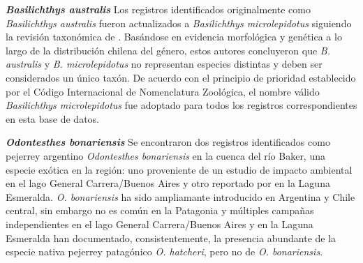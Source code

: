 \documentclass[sn-apa,pdflatex]{sn-jnl}
\newenvironment{Shaded}{\begin{snugshade}}{\end{snugshade}}
\newcommand{\CommentTok}[1]{\textcolor[rgb]{0.56,0.35,0.01}{\textit{#1}}}
\newcommand{\NormalTok}[1]{#1}
\newcommand{\OtherTok}[1]{\textcolor[rgb]{0.56,0.35,0.01}{#1}}
\newcommand{\SpecialCharTok}[1]{\textcolor[rgb]{0.81,0.36,0.00}{\textbf{#1}}}
\newcommand{\StringTok}[1]{\textcolor[rgb]{0.31,0.60,0.02}{#1}}
\begin{document}
\textbf{\emph{Basilichthys australis}} Los registros identificados
originalmente como \emph{Basilichthys australis} fueron actualizados a
\emph{Basilichthys microlepidotus} siguiendo la revisión taxonómica de
\citet{velizGeneroBasilichthysTeleostei2012}. Basándose en evidencia
morfológica y genética a lo largo de la distribución chilena del género,
estos autores concluyeron que \emph{B. australis} y \emph{B.
microlepidotus} no representan especies distintas y deben ser
considerados un único taxón. De acuerdo con el principio de prioridad
establecido por el Código Internacional de Nomenclatura Zoológica, el
nombre válido \emph{Basilichthys microlepidotus} fue adoptado para todos
los registros correspondientes en esta base de datos.

\begin{Shaded}
\end{Shaded}

\textbf{\emph{Odontesthes bonariensis}} Se encontraron dos registros
identificados como pejerrey argentino \emph{Odontesthes bonariensis} en
la cuenca del río Baker, una especie exótica en la región: uno
proveniente de un estudio de impacto ambiental en el lago General
Carrera/Buenos Aires y otro reportado por
\citet{zamaIntroductionAysenChile1984} en la Laguna Esmeralda. \emph{O.
bonariensis} ha sido ampliamante introducido en Argentina y Chile
central, sin embargo no es común en la Patagonia y múltiples campañas
independientes en el lago General Carrera/Buenos Aires y en la Laguna
Esmeralda han documentado, consistentemente, la presencia abundante de
la especie nativa pejerrey patagónico \emph{O. hatcheri}, pero no de
\emph{O. bonariensis}.
\end{document}
